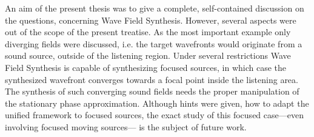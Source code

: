 \vspace{3mm}
An aim of the present thesis was to give a complete, self-contained discussion on the questions, concerning Wave Field Synthesis.
However, several aspects were out of the scope of the present treatise.
As the most important example only diverging fields were discussed, i.e. the target wavefronts would originate from a sound source, outside of the listening region.
Under several restrictions Wave Field Synthesis is capable of synthesizing focused sources, in which case the synthesized wavefront converges towards a focal point inside the listening area.
The synthesis of such converging sound fields needs the proper manipulation of the stationary phase approximation.
Although hints were given, how to adapt the unified framework to focused sources, the exact study of this focused case---even involving focused moving sources--- is the subject of future work.